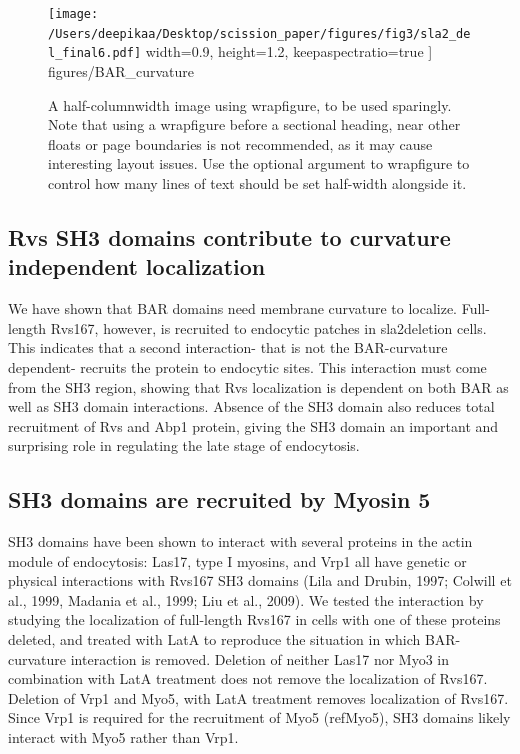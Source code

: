 \documentclass[9pt,lineno]{elife}
\begin{document}
\begin{figure}[h]	
	\texttt{[image: /Users/deepikaa/Desktop/scission\_paper/figures/fig3/sla2\_del\_final6.pdf]}
	width=0.9\textwidth,
	height=1.2\textwidth,
	keepaspectratio=true
	] {figures/BAR_curvature}
	\caption{A half-columnwidth image using wrapfigure, to be used sparingly. Note that using a wrapfigure before a sectional heading, near other floats or page boundaries is not recommended, as it may cause interesting layout issues. Use the optional argument to wrapfigure to control how many lines of text should be set half-width alongside it.}
	\label{fig:halfwidth}
\end{figure}


\subsection{Rvs SH3 domains contribute to curvature independent localization}
We have shown that BAR domains need membrane curvature to localize. Full-length Rvs167, however, is recruited to endocytic patches in sla2deletion cells. This indicates that a second interaction- that is not the BAR-curvature dependent- recruits the protein to endocytic sites. This interaction must come from the SH3 region, showing that Rvs localization is dependent on both BAR as well as SH3 domain interactions. Absence of the SH3 domain also reduces total recruitment of Rvs and Abp1 protein, giving the SH3 domain an important and surprising role in regulating the late stage of endocytosis. 

\subsection{SH3 domains are recruited by Myosin 5}
SH3 domains have been shown to interact with several proteins in the actin module of endocytosis: Las17, type I myosins, and Vrp1 all have genetic or physical interactions with Rvs167 SH3 domains (Lila and Drubin, 1997; Colwill et al., 1999, Madania et al., 1999; Liu et al., 2009). 
We tested the interaction by studying the localization of full-length Rvs167 in cells with one of these proteins deleted, and treated with LatA to reproduce the situation in which BAR-curvature interaction is removed. 
Deletion of neither Las17 nor Myo3 in combination with LatA treatment does not remove the localization of Rvs167. Deletion of Vrp1 and Myo5, with LatA treatment removes localization of Rvs167. Since Vrp1 is required for the recruitment of Myo5 (refMyo5), SH3 domains likely interact with Myo5 rather than Vrp1. 
\end{document}

